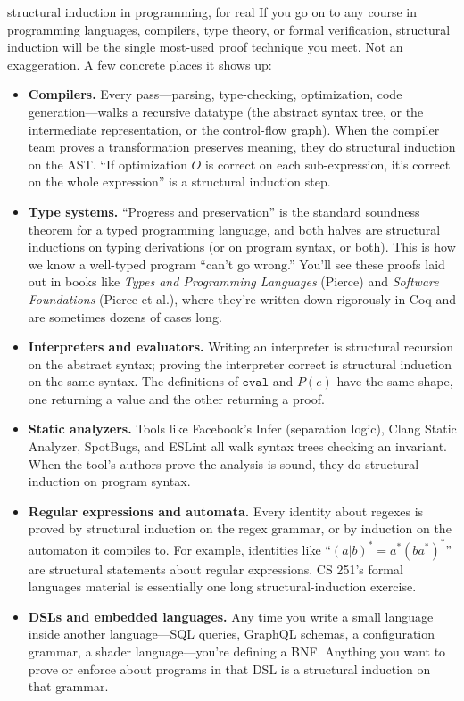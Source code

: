 \documentclass[11pt]{article}
\begin{document}
\begin{sidebar}{structural induction in programming, for real}
If you go on to any course in programming languages, compilers, type theory, or formal verification, structural induction will be the single most-used proof technique you meet. Not an exaggeration. A few concrete places it shows up:

\begin{itemize}
  \item \textbf{Compilers.} Every pass---parsing, type-checking, optimization, code generation---walks a recursive datatype (the abstract syntax tree, or the intermediate representation, or the control-flow graph). When the compiler team proves a transformation preserves meaning, they do structural induction on the AST. ``If optimization $O$ is correct on each sub-expression, it's correct on the whole expression'' is a structural induction step.
  \item \textbf{Type systems.} ``Progress and preservation'' is the standard soundness theorem for a typed programming language, and both halves are structural inductions on typing derivations (or on program syntax, or both). This is how we know a well-typed program ``can't go wrong.'' You'll see these proofs laid out in books like \emph{Types and Programming Languages} (Pierce) and \emph{Software Foundations} (Pierce et al.), where they're written down rigorously in Coq and are sometimes dozens of cases long.
  \item \textbf{Interpreters and evaluators.} Writing an interpreter is structural recursion on the abstract syntax; proving the interpreter correct is structural induction on the same syntax. The definitions of $\texttt{eval}$ and $P(e)$ have the same shape, one returning a value and the other returning a proof.
  \item \textbf{Static analyzers.} Tools like Facebook's Infer (separation logic), Clang Static Analyzer, SpotBugs, and ESLint all walk syntax trees checking an invariant. When the tool's authors prove the analysis is sound, they do structural induction on program syntax.
  \item \textbf{Regular expressions and automata.} Every identity about
  regexes is proved by structural induction on the regex grammar, or by
  induction on the automaton it compiles to. For example, identities like
  ``$(a|b)^* = a^* (b a^*)^*$'' are structural statements about regular
  expressions. CS 251's formal languages material is essentially one
  long structural-induction exercise.
  \item \textbf{DSLs and embedded languages.} Any time you write a small language inside another language---SQL queries, GraphQL schemas, a configuration grammar, a shader language---you're defining a BNF. Anything you want to prove or enforce about programs in that DSL is a structural induction on that grammar.
\end{itemize}


\end{sidebar}
\end{document}
